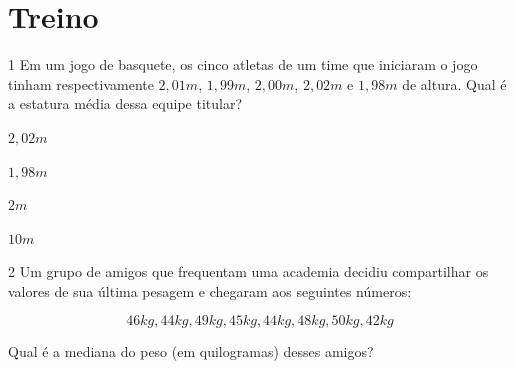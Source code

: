 

\section*{Treino}

\num{1} Em um jogo de basquete, os cinco atletas de um time que iniciaram o jogo
tinham respectivamente $2,01 m$, $1,99 m$, $2,00 m$, $2,02 m$ e $1,98 m$ de
altura. Qual é a estatura média dessa equipe titular?

\begin{escolha}[itemsep=0pt]
\item $2,02 m$
\item $1,98 m$
\item $2 m$
\item $10 m$
\end{escolha}











\num{2} Um grupo de amigos que frequentam uma academia decidiu compartilhar os
valores de sua última pesagem e chegaram aos seguintes números:

$$46 kg, 44 kg, 49 kg, 45 kg, 44 kg, 48 kg, 50 kg, 42 kg$$

Qual é a mediana do peso (em quilogramas) desses amigos?

